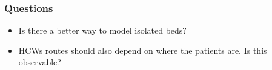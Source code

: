 \documentclass[aspectratio=169, 9pt, xcolor=table]{beamer}
\begin{document}
\begin{frame}
    \frametitle{Questions}
    
    \begin{itemize}
        \item Is there a better way to model isolated beds?
        \item HCWs routes should also depend on where the patients are. Is this observable?
        
    \end{itemize}
\end{frame}
        

        
\end{document}
